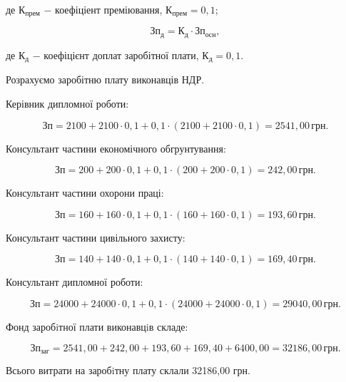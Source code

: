 \noindent де $\text{К}_{\text{прем}}$ $-$ коефіціент преміювання, $\text{К}_{\text{прем}} = 0,1$;

\begin{equation}
\text{Зп}_{\text{д}} = \text{К}_{\text{д}} \cdot \text{Зп}_{\text{осн}},
\end{equation}

\noindent де $\text{К}_{\text{д}}$ $-$ коефіцієнт доплат заробітної плати, $\text{К}_{\text{д}} = 0,1$. 

\vspace{1.5em}

Розрахуємо заробітню плату виконавців НДР.

Керівник дипломної роботи:

\[
\text{Зп} = 2100 + 2100 \cdot 0,1 + 0,1 \cdot (2100 + 2100 \cdot 0,1) = 2541,00 \, \text{грн}.
\]

\vspace{1.5em}

Консультант частини економічного обгрунтування:

\[
\text{Зп} = 200 + 200 \cdot 0,1 + 0,1 \cdot (200 + 200 \cdot 0,1) = 242,00 \, \text{грн}.
\]

\vspace{1.5em}

Консультант частини охорони праці:

\[
\text{Зп} = 160 + 160 \cdot 0,1 + 0,1 \cdot (160 + 160 \cdot 0,1) = 193,60 \, \text{грн}.
\]

\vspace{1.5em}

Консультант частини цивільного захисту:

\[
\text{Зп} = 140 + 140 \cdot 0,1 + 0,1 \cdot (140 + 140 \cdot 0,1) = 169,40 \, \text{грн}.
\]

\vspace{1.5em}

Консультант дипломної роботи:

\[
\text{Зп} = 24000 + 24000 \cdot 0,1 + 0,1 \cdot (24000 + 24000 \cdot 0,1) = 29040,00 \, \text{грн}.
\]

\vspace{1.5em}

Фонд заробiтної плати виконавцiв складе:

\[
\text{Зп}_{\text{заг}} = 2541,00 + 242,00 + 193,60 + 169,40 + 6400,00 = 32186,00 \, \text{грн}.
\]

\vspace{1.5em}

Всього витрати на заробiтну плату склали 32186,00 грн.

